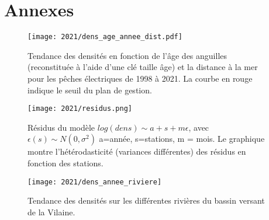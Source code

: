 \documentclass[10pt,twocolumn,titlepage,twoside]{article}\usepackage[]{graphicx}\usepackage[]{color}
\begin{document}
\section{Annexes}
\small

\normalsize
\begin{figure}[htbp]
\centering
\texttt{[image: 2021/dens\_age\_annee\_dist.pdf]}
\caption[Densité par âge et distance.]{Tendance des
densités en fonction de l'âge des anguilles (reconstituée à l'aide d'une clé
taille âge) et la distance à la mer pour les pêches électriques de 1998 à 2021.
La courbe en rouge indique le seuil du plan de gestion.}
\label{dens_age_annee_dist}
\end{figure}


\begin{figure}[htbp]
\centering
\texttt{[image: 2021/residus.png]}
\caption[Tendance des densités modèle]{Résidus du modèle $log(dens) \sim a +s +m
\epsilon$, avec $\epsilon(s) \sim N(0,\sigma^2)$ a=année, s=stations, m = mois.
Le graphique montre l'hétérodasticité (variances différentes) des résidus en
fonction des stations.}
\label{residus}
\end{figure}

\begin{figure}[htbp]
\centering
 \texttt{[image: 2021/dens\_annee\_riviere]}
\caption[Tendance des densités par rivières]{Tendance des densités sur les
différentes rivières du bassin versant de la Vilaine.}
\label{dens_annee_riviere}
\end{figure}
\end{document}
